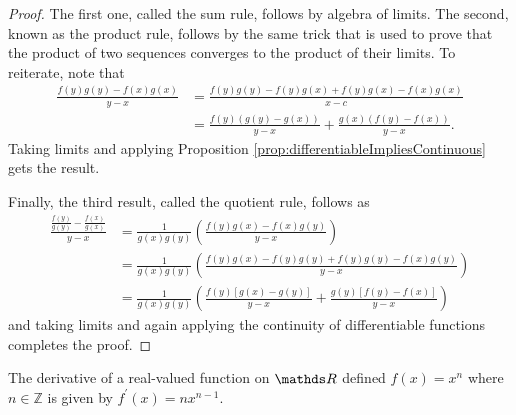 \begin{proof}
	The first one, called the sum rule, follows by algebra of limits.
	The second, known as the product rule, follows by the same trick that
	is used to prove that the product of two sequences converges to the
	product of their limits. To reiterate, note that 
	\begin{align*}
		\frac{f\left(y\right)g\left(y\right)-f\left(x\right)g\left(x\right)}{y-x} & =\frac{f\left(y\right)g\left(y\right)-f\left(y\right)g\left(x\right)+f\left(y\right)g\left(x\right)-f\left(x\right)g\left(x\right)}{x-c}\\
		& =\frac{f\left(y\right)\left(g\left(y\right)-g\left(x\right)\right)}{y-x}+\frac{g\left(x\right)\left(f\left(y\right)-f\left(x\right)\right)}{y-x}.
	\end{align*}
	Taking limits and applying Proposition \ref{prop:differentiableImpliesContinuous}
	gets the result.
	
	Finally, the third result, called the quotient rule, follows as 
	\begin{align*}
		\frac{\frac{f\left(y\right)}{g\left(y\right)}-\frac{f\left(x\right)}{g\left(x\right)}}{y-x} & =\frac{1}{g\left(x\right)g\left(y\right)}\left(\frac{f\left(y\right)g\left(x\right)-f\left(x\right)g\left(y\right)}{y-x}\right)\\
		& =\frac{1}{g\left(x\right)g\left(y\right)}\left(\frac{f\left(y\right)g\left(x\right)-f\left(y\right)g\left(y\right)+f\left(y\right)g\left(y\right)-f\left(x\right)g\left(y\right)}{y-x}\right)\\
		& =\frac{1}{g\left(x\right)g\left(y\right)}\left(\frac{f\left(y\right)\left[g\left(x\right)-g\left(y\right)\right]}{y-x}+\frac{g\left(y\right)\left[f\left(y\right)-f\left(x\right)\right]}{y-x}\right)
	\end{align*}
	and taking limits and again applying the continuity of differentiable
	functions completes the proof.
\end{proof}
\begin{cor}
	\label{cor:powerRule}The derivative of a real-valued function on
	$\R$ defined $f\left(x\right)=x^{n}$ where $n\in\mathds{Z}$ is
	given by $f^{\prime}\left(x\right)=nx^{n-1}.$
\end{cor}

